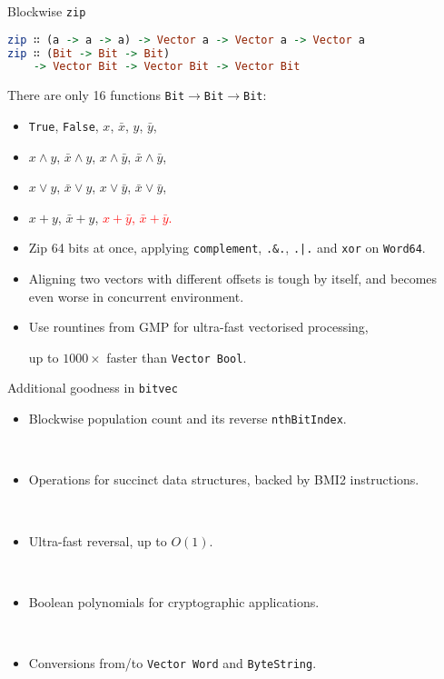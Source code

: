 \documentclass[handout]{beamer}
\begin{document}
\begin{frame}[fragile]{Blockwise {\tt zip}}

\begin{lstlisting}[language=Haskell]
zip ∷ (a -> a -> a) -> Vector a -> Vector a -> Vector a
zip ∷ (Bit -> Bit -> Bit)
    -> Vector Bit -> Vector Bit -> Vector Bit
\end{lstlisting}

\pause

\bigskip

There are only 16 functions {\tt Bit}${}\to{}${\tt Bit}${}\to{}${\tt Bit}:

\begin{itemize}[<+->]
\item {\tt True}, {\tt False}, $x$, $\bar x$, $y$, $\bar y$,
\item $ x \wedge y $, $\bar x \wedge y$, $x \wedge \bar y$, $\bar x \wedge \bar y$,
\item $ x \vee y $, $\bar x \vee y$, $x \vee \bar y$, $\bar x \vee \bar y$,
\item $ x + y $, $\bar x + y$, \textcolor{red}{$x + \bar y$, $\bar x + \bar y$.}
\end{itemize}

\bigskip

\begin{itemize}[<+->]
\item Zip 64 bits at once, applying {\tt complement},
      {\tt .\&.}, {\tt .|.} and {\tt xor} on {\tt Word64}.
\item Aligning two vectors with different offsets is tough by itself,
      and becomes even worse in concurrent environment.
\item Use rountines from GMP for ultra-fast vectorised processing, \par
      up to $1000\times$ faster than {\tt Vector Bool}.
\end{itemize}

\end{frame}

\begin{frame}{Additional goodness in {\tt bitvec}}

\begin{itemize}[<+->]
\item Blockwise population count and its reverse {\tt nthBitIndex}. \par ~
\item Operations for succinct data structures, backed by BMI2 instructions. \par ~
\item Ultra-fast reversal, up to $O(1)$. \par ~
\item Boolean polynomials for cryptographic applications. \par ~
\item Conversions from/to {\tt Vector Word} and {\tt ByteString}.
\end{itemize}

\end{frame}
\end{document}
